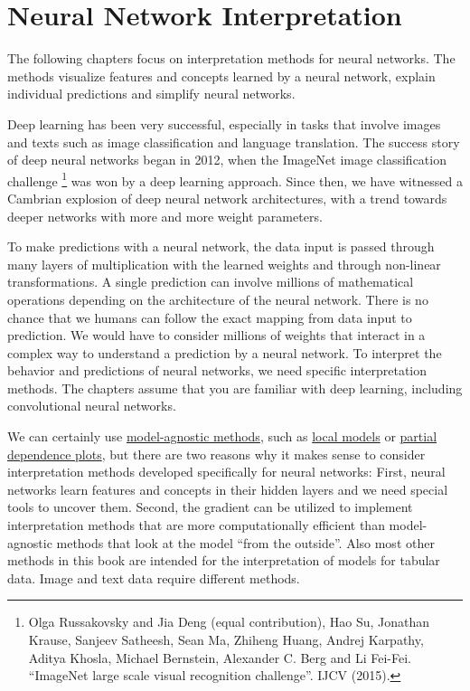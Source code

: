 \documentclass[
  10pt,
]{scrbook}
\begin{document}
\hypertarget{neural-networks}{%
\chapter{Neural Network Interpretation}\label{neural-networks}}

The following chapters focus on interpretation methods for neural networks.
The methods visualize features and concepts learned by a neural network, explain individual predictions and simplify neural networks.

Deep learning has been very successful, especially in tasks that involve images and texts such as image classification and language translation.
The success story of deep neural networks began in 2012, when the ImageNet image classification challenge \footnote{Olga Russakovsky and Jia Deng (equal contribution), Hao Su, Jonathan Krause, Sanjeev Satheesh, Sean Ma, Zhiheng Huang, Andrej Karpathy, Aditya Khosla, Michael Bernstein, Alexander C. Berg and Li Fei-Fei. ``ImageNet large scale visual recognition challenge''. IJCV (2015).} was won by a deep learning approach.
Since then, we have witnessed a Cambrian explosion of deep neural network architectures, with a trend towards deeper networks with more and more weight parameters.

To make predictions with a neural network, the data input is passed through many layers of multiplication with the learned weights and through non-linear transformations.
A single prediction can involve millions of mathematical operations depending on the architecture of the neural network.
There is no chance that we humans can follow the exact mapping from data input to prediction.
We would have to consider millions of weights that interact in a complex way to understand a prediction by a neural network.
To interpret the behavior and predictions of neural networks, we need specific interpretation methods.
The chapters assume that you are familiar with deep learning, including convolutional neural networks.

We can certainly use \protect\hyperlink{agnostic}{model-agnostic methods}, such as \protect\hyperlink{lime}{local models} or \protect\hyperlink{pdp}{partial dependence plots}, but there are two reasons why it makes sense to consider interpretation methods developed specifically for neural networks:
First, neural networks learn features and concepts in their hidden layers and we need special tools to uncover them.
Second, the gradient can be utilized to implement interpretation methods that are more computationally efficient than model-agnostic methods that look at the model ``from the outside''.
Also most other methods in this book are intended for the interpretation of models for tabular data.
Image and text data require different methods.
\end{document}
